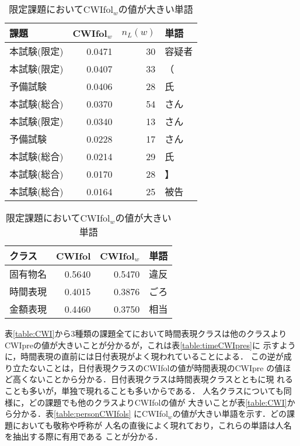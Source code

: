 \begin{table}[tbp]
\caption{\label{table:personCWIfols}人名に対してCWIfol$_w$の値が大きい単語}
\begin{center}
\begin{tabular}{|l||r|r|p{1.5cm}|} \hline
課題       & CWIfol$_w$ & \(n_L(w)\) & 単語 \\ \hline \hline
本試験(限定) & 0.0471 &   30 &     容疑者 \\ \hline
本試験(限定) & 0.0407 &   33 &         （ \\ \hline
予備試験     & 0.0406 &   28 &         氏 \\ \hline
本試験(総合) & 0.0370 &   54 &       さん \\ \hline
本試験(限定) & 0.0340 &   13 &       さん \\ \hline
予備試験     & 0.0228 &   17 &       さん \\ \hline
本試験(総合) & 0.0214 &   29 &         氏 \\ \hline
本試験(総合) & 0.0170 &   28 &         】 \\ \hline
本試験(総合) & 0.0164 &   25 &       被告 \\ \hline
\end{tabular}
\end{center}

\caption{\label{table:arrestCWIfols}限定課題においてCWIfol$_w$の値が大きい単語}
\begin{center}
\begin{tabular}{|l||r|r|p{1.5cm}|} \hline
クラス   &     CWIfol & CWIfol$_w$ & 単語 \\ \hline \hline
固有物名 &     0.5640 &     0.5470 & 違反 \\ \hline
時間表現 &     0.4015 &     0.3876 & ごろ \\ \hline
金額表現 &     0.4460 &     0.3750 & 相当 \\ \hline
\end{tabular}
\end{center}
\end{table}

表\ref{table:CWI}から3種類の課題全てにおいて時間表現クラスは他のクラスより
CWIpreの値が大きいことが分かるが，これは表\ref{table:timeCWIpres}に
示すように，時間表現の直前には日付表現がよく現われていることによる．
この逆が成り立たないことは，日付表現クラスのCWIfolの値が時間表現のCWIpre
の値ほど高くないことから分かる．日付表現クラスは時間表現クラスとともに現
れることも多いが，単独で現れることも多いからである．
人名クラスについても同様に，どの課題でも他のクラスよりCWIfolの値が
大きいことが表\ref{table:CWI}から分かる．表\ref{table:personCWIfols} 
にCWIfol$_w$の値が大きい単語を示す．どの課題においても敬称や呼称が
人名の直後によく現れており，これらの単語は人名を抽出する際に有用である
ことが分かる．

